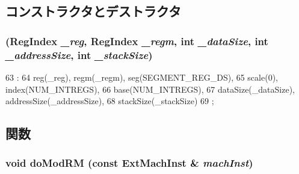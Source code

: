 \subsection{コンストラクタとデストラクタ}
\hypertarget{structX86ISA_1_1EmulEnv_a150178afb4bf886ad49be8f31f98e14b}{
\subsubsection[{EmulEnv}]{ ({\bf RegIndex} {\em \_\-reg}, \/  {\bf RegIndex} {\em \_\-regm}, \/  int {\em \_\-dataSize}, \/  int {\em \_\-addressSize}, \/  int {\em \_\-stackSize})}}
\label{structX86ISA_1_1EmulEnv_a150178afb4bf886ad49be8f31f98e14b}



\begin{DoxyCode}
63                                                                  :
64             reg(_reg), regm(_regm), seg(SEGMENT_REG_DS),
65             scale(0), index(NUM_INTREGS),
66             base(NUM_INTREGS),
67             dataSize(_dataSize), addressSize(_addressSize),
68             stackSize(_stackSize)
69         {;}

\end{DoxyCode}


\subsection{関数}
\hypertarget{structX86ISA_1_1EmulEnv_ae8a901694f1a63aaa9cf3c28faabe4ed}{
\subsubsection[{doModRM}]{\setlength{\rightskip}{0pt plus 5cm}void doModRM (const {\bf ExtMachInst} \& {\em machInst})}}
\label{structX86ISA_1_1EmulEnv_ae8a901694f1a63aaa9cf3c28faabe4ed}



